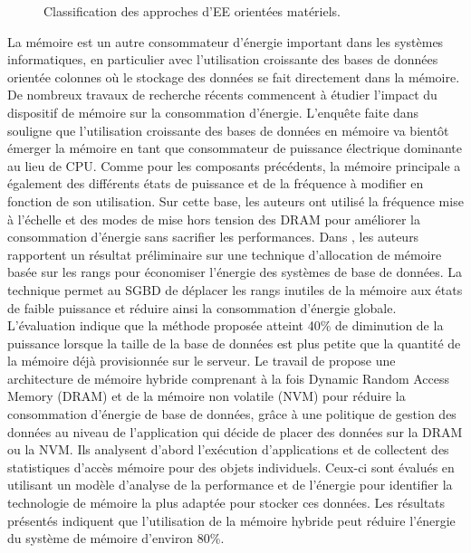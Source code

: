\begin{figure}
\footnotesize
\begin{center}

\caption{Classification des approches d’EE orientées matériels.}
\label{fig:hardware-approaches-classification}
\end{center}
\end{figure}

La mémoire est un autre consommateur d'énergie important dans les systèmes informatiques, en particulier avec l'utilisation croissante des bases de données orientée colonnes où le stockage des données se fait directement dans la mémoire. De nombreux travaux de recherche récents commencent à étudier l'impact du dispositif de mémoire sur la consommation d'énergie. L'enquête faite dans \cite{Appuswamy15} souligne que l'utilisation croissante des bases de données en mémoire va bientôt émerger la mémoire en tant que consommateur de puissance électrique dominante au lieu de CPU. Comme pour les composants précédents, la mémoire principale a également des différents états de puissance et de la fréquence à modifier en fonction de son utilisation. Sur cette base, les auteurs ont utilisé la fréquence mise à l'échelle et des modes de mise hors tension des DRAM pour améliorer la consommation d'énergie sans sacrifier les performances. Dans \cite{Korkmaz15}, les auteurs rapportent un résultat préliminaire sur une technique d'allocation de mémoire basée sur les rangs pour économiser l'énergie des systèmes de base de données. La technique permet au SGBD de déplacer les rangs inutiles de la mémoire aux états de faible puissance et réduire ainsi la consommation d'énergie globale. L'évaluation indique que la méthode proposée atteint 40\% de diminution de la puissance lorsque la taille de la base de données est plus petite que la quantité de la mémoire déjà provisionnée sur le serveur. Le travail de \cite{Hassan15} propose une architecture de mémoire hybride comprenant à la fois Dynamic Random Access Memory (DRAM) et de la mémoire non volatile (NVM) pour réduire la consommation d'énergie de base de données, grâce à une politique de gestion des données au niveau de l'application qui décide de placer des données sur la DRAM ou la NVM. Ils analysent d'abord l'exécution d'applications et de collectent des statistiques d'accès mémoire pour des objets individuels. Ceux-ci sont évalués en utilisant un modèle d'analyse de la performance et de l'énergie pour identifier la technologie de mémoire la plus adaptée pour stocker ces données. Les résultats présentés indiquent que l'utilisation de la mémoire hybride peut réduire l'énergie du système de mémoire d'environ 80\%.

